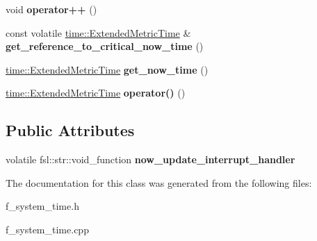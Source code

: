 \begin{DoxyCompactItemize}
void {\bfseries operator++} ()
\item 
\mbox{\label{classfsl_1_1os_1_1system__time_a6a40b98c063945dce7f1b6e26fd25481}} 
const volatile \mbox{\hyperlink{classtime_1_1_extended_metric_time}{time\+::\+Extended\+Metric\+Time}} \& {\bfseries get\+\_\+reference\+\_\+to\+\_\+critical\+\_\+now\+\_\+time} ()
\item 
\mbox{\label{classfsl_1_1os_1_1system__time_aceeeef62574f78443477152505266b19}} 
\mbox{\hyperlink{classtime_1_1_extended_metric_time}{time\+::\+Extended\+Metric\+Time}} {\bfseries get\+\_\+now\+\_\+time} ()
\item 
\mbox{\label{classfsl_1_1os_1_1system__time_a28bfa54ff3b8a8b6d58cdb09bfb9e336}} 
\mbox{\hyperlink{classtime_1_1_extended_metric_time}{time\+::\+Extended\+Metric\+Time}} {\bfseries operator()} ()
\end{DoxyCompactItemize}
\subsection*{Public Attributes}
\begin{DoxyCompactItemize}
\item 
\mbox{\label{classfsl_1_1os_1_1system__time_a0ab47c001900762acb4d2ffd4fcede9a}} 
volatile fsl\+::str\+::void\+\_\+function {\bfseries now\+\_\+update\+\_\+interrupt\+\_\+handler}
\end{DoxyCompactItemize}


The documentation for this class was generated from the following files\+:\begin{DoxyCompactItemize}
\item 
f\+\_\+system\+\_\+time.\+h\item 
f\+\_\+system\+\_\+time.\+cpp\end{DoxyCompactItemize}
